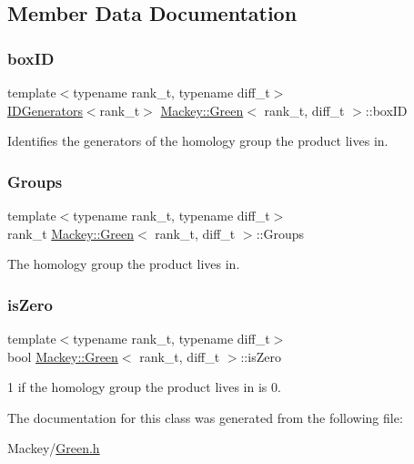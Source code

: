 \subsection{Member Data Documentation}
\mbox{\label{classMackey_1_1Green_aea166896ebdaa17b3c5d21b2ae936e0d}} 
\subsubsection{\texorpdfstring{box\+ID}{boxID}}
{\footnotesize\ttfamily template$<$typename rank\+\_\+t, typename diff\+\_\+t$>$ \\
\hyperlink{classMackey_1_1IDGenerators}{I\+D\+Generators}$<$rank\+\_\+t$>$ \hyperlink{classMackey_1_1Green}{Mackey\+::\+Green}$<$ rank\+\_\+t, diff\+\_\+t $>$\+::box\+ID}



Identifies the generators of the homology group the product lives in. 

\mbox{\label{classMackey_1_1Green_acfa5ea708949024bd24f1c1e21399cbc}} 
\subsubsection{\texorpdfstring{Groups}{Groups}}
{\footnotesize\ttfamily template$<$typename rank\+\_\+t, typename diff\+\_\+t$>$ \\
rank\+\_\+t \hyperlink{classMackey_1_1Green}{Mackey\+::\+Green}$<$ rank\+\_\+t, diff\+\_\+t $>$\+::Groups}



The homology group the product lives in. 

\mbox{\label{classMackey_1_1Green_a12a01a6d1715538af0bdc6b34fad6b85}} 
\subsubsection{\texorpdfstring{is\+Zero}{isZero}}
{\footnotesize\ttfamily template$<$typename rank\+\_\+t, typename diff\+\_\+t$>$ \\
bool \hyperlink{classMackey_1_1Green}{Mackey\+::\+Green}$<$ rank\+\_\+t, diff\+\_\+t $>$\+::is\+Zero}



1 if the homology group the product lives in is 0. 



The documentation for this class was generated from the following file\+:\begin{DoxyCompactItemize}
\item 
Mackey/\hyperlink{Green_8h}{Green.\+h}\end{DoxyCompactItemize}
